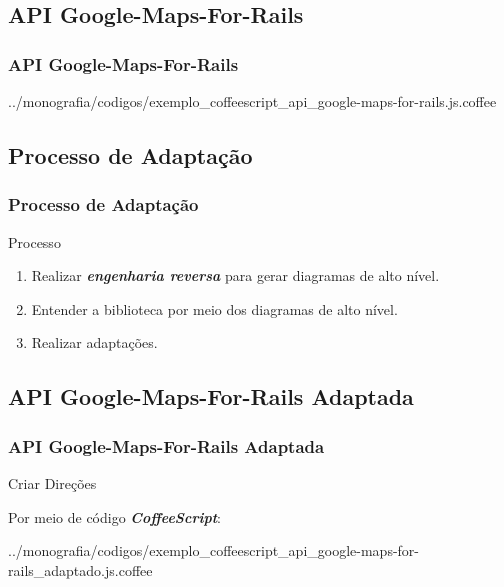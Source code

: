 \subsection{API Google-Maps-For-Rails}
\begin{frame}
 \frametitle{API Google-Maps-For-Rails}

      
      {../monografia/codigos/exemplo_coffeescript_api_google-maps-for-rails.js.coffee}

\end{frame}


\subsection{Processo de Adaptação}
\begin{frame}
 \frametitle{Processo de Adaptação}

  \begin{block}{Processo}

    \begin{enumerate}

     \item Realizar \emph{\textbf{engenharia reversa}} para gerar diagramas de alto nível.

     \item Entender a biblioteca por meio dos diagramas de alto nível.

     \item Realizar adaptações.

    \end{enumerate}

  \end{block}

\end{frame}


\subsection{API Google-Maps-For-Rails Adaptada}
\begin{frame}
 \frametitle{API Google-Maps-For-Rails Adaptada}

  \begin{block}{Criar Direções}

   Por meio de código \emph{\textbf{CoffeeScript}}:

      
      {../monografia/codigos/exemplo_coffeescript_api_google-maps-for-rails_adaptado.js.coffee}

  \end{block}

\end{frame}
